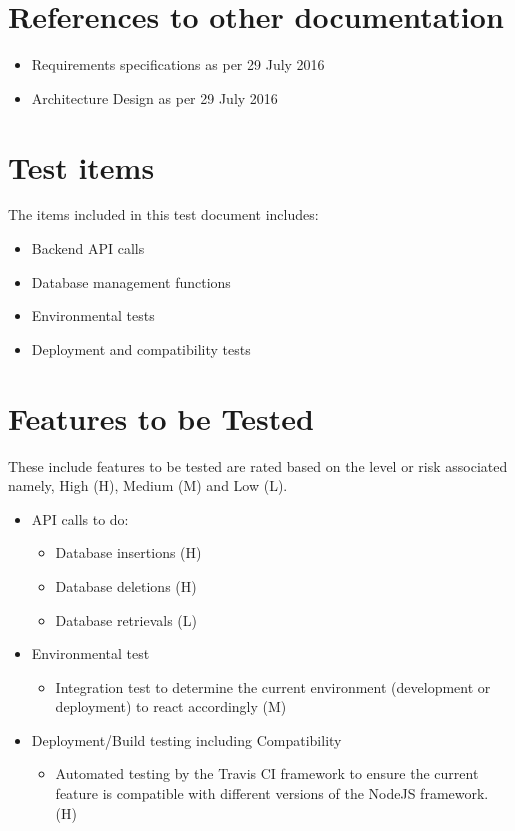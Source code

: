 \documentclass{article}
\begin{document}
\section{References to other documentation}
\begin{itemize}
	\item{Requirements specifications as per 29 July 2016}
	\item{Architecture Design as per 29 July 2016}
\end{itemize}

\section{Test items}
The items included in this test document includes:
\begin{itemize}
	\item Backend API calls
	\item Database management functions
	\item Environmental tests 
	\item Deployment and compatibility tests
\end{itemize} 

\section{Features to be Tested}
These include features to be tested are rated based on the level or risk associated namely, High (H), Medium (M) and Low (L).

\begin{itemize}
\item API calls to do:
	\begin{itemize}
	\item Database insertions (H)
	\item Database deletions (H)
	\item Database retrievals (L)
	\end{itemize}
\item Environmental test
	\begin{itemize}
	\item Integration test to determine the current environment (development or deployment) to react accordingly (M)
	\end{itemize}
\item Deployment/Build testing including Compatibility
		\begin{itemize}
	\item Automated testing by the Travis CI framework to ensure the current feature is compatible with different versions of the NodeJS framework. (H)
	\end{itemize}
\end{itemize}
\end{document}
